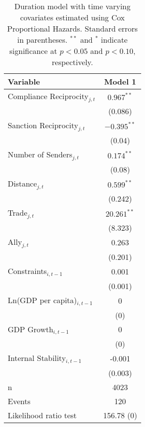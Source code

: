 \begin{table}[ht]
\centering
{\normalsize
\begin{tabular}{lc}
 Variable & Model 1 \\ 
  \hline
\hline
Compliance Reciprocity$_{j,t}$ & $0.967^{\ast\ast}$ \\ 
   & (0.086) \\ 
  Sanction Reciprocity$_{j,t}$ & $-0.395^{\ast\ast}$ \\ 
   & (0.04) \\ 
  Number of Senders$_{j,t}$ & $0.174^{\ast\ast}$ \\ 
   & (0.08) \\ 
  Distance$_{j,t}$ & $0.599^{\ast\ast}$ \\ 
   & (0.242) \\ 
  Trade$_{j,t}$ & $20.261^{\ast\ast}$ \\ 
   & (8.323) \\ 
  Ally$_{j,t}$ & 0.263 \\ 
   & (0.201) \\ 
   \hline
Constraints$_{i,t-1}$ & 0.001 \\ 
   & (0.001) \\ 
  Ln(GDP per capita)$_{i,t-1}$ & 0 \\ 
   & (0) \\ 
   \hline
GDP Growth$_{i,t-1}$ & 0 \\ 
   & (0) \\ 
  Internal Stability$_{i,t-1}$ & -0.001 \\ 
   & (0.003) \\ 
   \hline
n & 4023 \\ 
  Events & 120 \\ 
  Likelihood ratio test & 156.78 (0) \\ 
   \hline
\hline
\end{tabular}
}
\caption{Duration model with time varying covariates estimated using Cox Proportional Hazards. Standard errors in parentheses. $^{**}$ and $^{*}$ indicate significance at $p< 0.05 $ and $p< 0.10 $, respectively.} 
\end{table}
